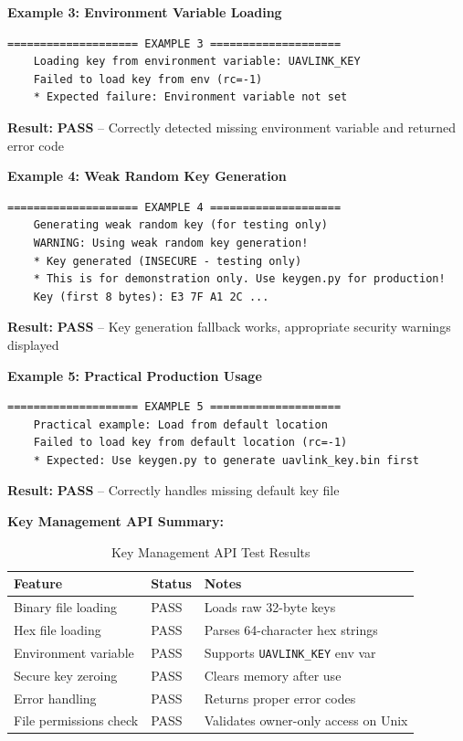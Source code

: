 \documentclass[11pt,a4paper]{article}
\begin{document}
\textbf{Example 3: Environment Variable Loading}
\begin{lstlisting}[basicstyle=\ttfamily\footnotesize]
	==================== EXAMPLE 3 ====================
	Loading key from environment variable: UAVLINK_KEY
	Failed to load key from env (rc=-1)
	* Expected failure: Environment variable not set
\end{lstlisting}
\textbf{Result:} \textcolor{codegreen}{\textbf{PASS}} -- Correctly detected missing environment variable and returned error code

\vspace{0.3cm}

\textbf{Example 4: Weak Random Key Generation}
\begin{lstlisting}[basicstyle=\ttfamily\footnotesize]
	==================== EXAMPLE 4 ====================
	Generating weak random key (for testing only)
	WARNING: Using weak random key generation!
	* Key generated (INSECURE - testing only)
	* This is for demonstration only. Use keygen.py for production!
	Key (first 8 bytes): E3 7F A1 2C ...
\end{lstlisting}
\textbf{Result:} \textcolor{codegreen}{\textbf{PASS}} -- Key generation fallback works, appropriate security warnings displayed

\vspace{0.3cm}

\textbf{Example 5: Practical Production Usage}
\begin{lstlisting}[basicstyle=\ttfamily\footnotesize]
	==================== EXAMPLE 5 ====================
	Practical example: Load from default location
	Failed to load key from default location (rc=-1)
	* Expected: Use keygen.py to generate uavlink_key.bin first
\end{lstlisting}
\textbf{Result:} \textcolor{codegreen}{\textbf{PASS}} -- Correctly handles missing default key file

\vspace{0.5cm}

\textbf{Key Management API Summary:}
\begin{table}[H]
	\centering
	\begin{tabular}{@{}lll@{}}
		\toprule
		\textbf{Feature} & \textbf{Status} & \textbf{Notes} \\
		\midrule
		Binary file loading     & \textcolor{codegreen}{PASS} & Loads raw 32-byte keys \\
		Hex file loading        & \textcolor{codegreen}{PASS} & Parses 64-character hex strings \\
		Environment variable    & \textcolor{codegreen}{PASS} & Supports \texttt{UAVLINK\_KEY} env var \\
		Secure key zeroing      & \textcolor{codegreen}{PASS} & Clears memory after use \\
		Error handling          & \textcolor{codegreen}{PASS} & Returns proper error codes \\
		File permissions check  & \textcolor{codegreen}{PASS} & Validates owner-only access on Unix \\
		\bottomrule
	\end{tabular}
	\caption{Key Management API Test Results}
\end{table}
\end{document}
